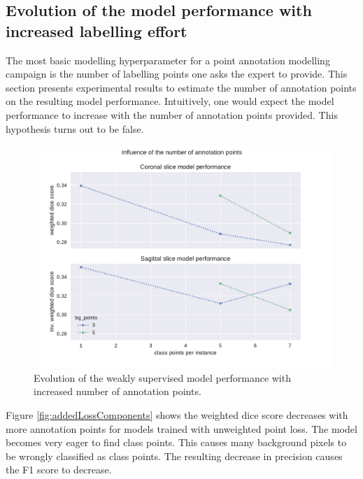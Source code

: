\subsection{Evolution of the model performance with increased labelling effort\label{sec:numberofpoints}}
\par{
    The most basic modelling hyperparameter for a point annotation modelling campaign is the number of labelling points one asks the expert to provide.
    This section presents experimental results to estimate the number of annotation points on the resulting model performance.
    Intuitively, one would expect the model performance to increase with the number of annotation points provided.
    This hypothesis turns out to be false.
}
\begin{figure}
    \centering
    \includegraphics[width=.95\textwidth]{images/BlobPoints_influence.pdf}
    \caption{Evolution of the weakly supervised model performance with increased number of annotation points.\label{fig:points_influence}}
\end{figure}

\par{
    Figure \ref{fig:addedLossComponents} shows the weighted dice score decreases with more annotation points for models trained with unweighted point loss.
    The model becomes very eager to find class points. This causes many background pixels to be wrongly classified as class points.
    The resulting decrease in precision causes the F1 score to decrease.
}
